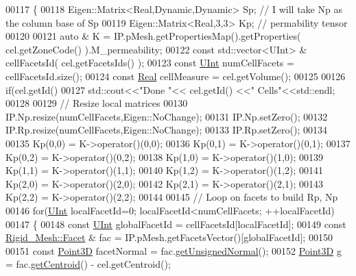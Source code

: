 \begin{DoxyCode}
00117 \{       
00118         Eigen::Matrix<Real,Dynamic,Dynamic> Sp;                             \textcolor{comment}{// I will take Np as the column
       base of Sp}
00119         Eigen::Matrix<Real,3,3> Kp;                                         \textcolor{comment}{// permability tensor}
00120         
00121         \textcolor{keyword}{auto} & K = IP.pMesh.getPropertiesMap().getProperties( cel.getZoneCode() ).M\_permeability;
00122         \textcolor{keyword}{const} std::vector<UInt> & cellFacetsId( cel.getFacetsIds() );
00123         \textcolor{keyword}{const} \hyperlink{namespaceFVCode3D_a4bf7e328c75d0fd504050d040ebe9eda}{UInt} numCellFacets  = cellFacetsId.size();
00124     \textcolor{keyword}{const} \hyperlink{namespaceFVCode3D_a40c1f5588a248569d80aa5f867080e83}{Real} cellMeasure    = cel.getVolume();
00125 
00126         \textcolor{keywordflow}{if}(cel.getId() %
00127                 std::cout<<\textcolor{stringliteral}{"Done "}<< cel.getId() <<\textcolor{stringliteral}{" Cells"}<<std::endl;
00128 
00129     \textcolor{comment}{// Resize local matrices}
00130     IP.Np.resize(numCellFacets,Eigen::NoChange);
00131         IP.Np.setZero();
00132     IP.Rp.resize(numCellFacets,Eigen::NoChange);
00133         IP.Rp.setZero();
00134         
00135         Kp(0,0) = K->operator()(0,0);
00136         Kp(0,1) = K->operator()(0,1);
00137         Kp(0,2) = K->operator()(0,2);
00138         Kp(1,0) = K->operator()(1,0);
00139         Kp(1,1) = K->operator()(1,1);
00140         Kp(1,2) = K->operator()(1,2);
00141     Kp(2,0) = K->operator()(2,0);
00142     Kp(2,1) = K->operator()(2,1);
00143     Kp(2,2) = K->operator()(2,2);
00144 
00145         \textcolor{comment}{// Loop on facets to build Rp, Np}
00146         \textcolor{keywordflow}{for}(\hyperlink{namespaceFVCode3D_a4bf7e328c75d0fd504050d040ebe9eda}{UInt} localFacetId=0; localFacetId<numCellFacets; ++localFacetId)
00147     \{
00148                 \textcolor{keyword}{const} \hyperlink{namespaceFVCode3D_a4bf7e328c75d0fd504050d040ebe9eda}{UInt} globalFacetId = cellFacetsId[localFacetId];
00149         \textcolor{keyword}{const} \hyperlink{classFVCode3D_1_1Rigid__Mesh_1_1Facet}{Rigid\_Mesh::Facet} & fac = IP.pMesh.getFacetsVector()[globalFacetId];
00150 
00151                 \textcolor{keyword}{const} \hyperlink{classFVCode3D_1_1Point3D}{Point3D} facetNormal     = fac.\hyperlink{classFVCode3D_1_1Rigid__Mesh_1_1Facet_ae8d74e38b74075a3ced8b1a229860120}{getUnsignedNormal}();
00152         \hyperlink{classFVCode3D_1_1Point3D}{Point3D} g                     = fac.\hyperlink{classFVCode3D_1_1Rigid__Mesh_1_1Facet_a0d4bcc392ef3da56ccdb40c22b6319e3}{getCentroid}() - cel.getCentroid();

\end{DoxyCode}
